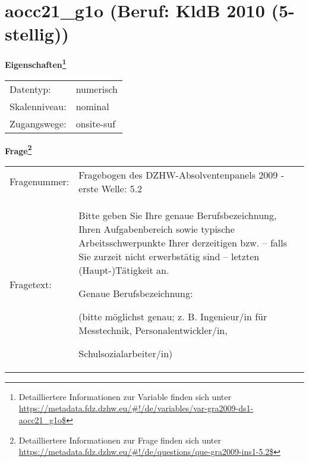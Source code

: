 
    \setcounter{footnote}{0}

    \vspace*{-1.8cm}
	\section{aocc21\_g1o (Beruf: KldB 2010 (5-stellig))}
	\label{section:aocc21_g1o}



    \vspace*{0.5cm}
    \noindent\textbf{Eigenschaften\footnote{Detailliertere Informationen zur Variable finden sich unter
		\url{https://metadata.fdz.dzhw.eu/\#!/de/variables/var-gra2009-ds1-aocc21_g1o$}}}\\
	\begin{tabularx}{\hsize}{@{}lX}
	Datentyp: & numerisch \\
	Skalenniveau: & nominal \\
	Zugangswege: &
	  onsite-suf
 \\
    \end{tabularx}



				\vspace*{0.5cm}
                \noindent\textbf{Frage\footnote{Detailliertere Informationen zur Frage finden sich unter
		              \url{https://metadata.fdz.dzhw.eu/\#!/de/questions/que-gra2009-ins1-5.2$}}}\\
				\begin{tabularx}{\hsize}{@{}lX}
					Fragenummer: &
					  Fragebogen des DZHW-Absolventenpanels 2009 - erste Welle:
					  5.2
 \\
					Fragetext: & Bitte geben Sie Ihre genaue Berufsbezeichnung, Ihren Aufgabenbereich sowie typische Arbeitsschwerpunkte Ihrer derzeitigen bzw. – falls Sie zurzeit nicht erwerbstätig sind – letzten (Haupt-)Tätigkeit an.\par  Genaue Berufsbezeichnung:\par  (bitte möglichst genau; z. B. Ingenieur/in für Messtechnik, Personalentwickler/in,\par  Schulsozialarbeiter/in) \\
				\end{tabularx}





